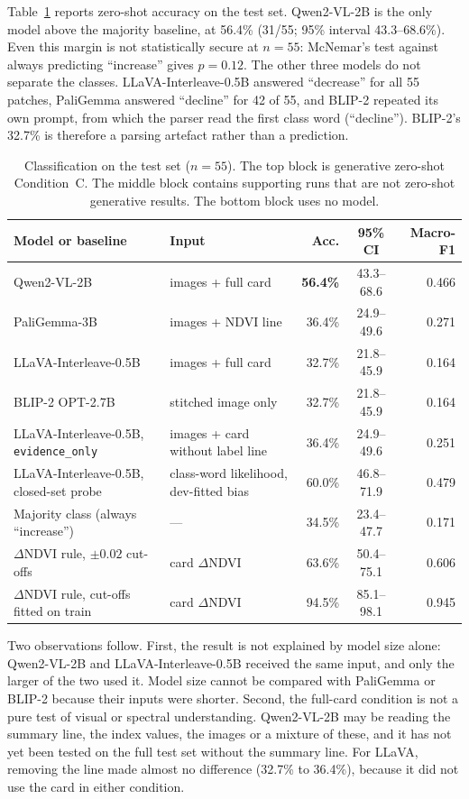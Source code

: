 \documentclass[11pt]{article}
\begin{document}
Table~\ref{tab:zeroshot} reports zero-shot accuracy on the test set.
Qwen2-VL-2B is the only model above the majority baseline, at 56.4\%
(31/55; 95\% interval 43.3--68.6\%). Even this margin is not
statistically secure at $n = 55$: McNemar's test against always
predicting ``increase'' gives $p = 0.12$. The other three models do not
separate the classes. LLaVA-Interleave-0.5B answered ``decrease'' for
all 55 patches, PaliGemma answered ``decline'' for 42 of 55, and BLIP-2
repeated its own prompt, from which the parser read the first class word
(``decline''). BLIP-2's 32.7\% is therefore a parsing artefact rather
than a prediction.

\begin{table}[t]
\centering
\small
\begin{tabular}{llrcr}
\toprule
Model or baseline & Input & Acc. & 95\% CI & Macro-F1 \\
\midrule
Qwen2-VL-2B & images + full card & \textbf{56.4\%} & 43.3--68.6 & 0.466 \\
PaliGemma-3B & images + NDVI line & 36.4\% & 24.9--49.6 & 0.271 \\
LLaVA-Interleave-0.5B & images + full card & 32.7\% & 21.8--45.9 & 0.164 \\
BLIP-2 OPT-2.7B & stitched image only & 32.7\% & 21.8--45.9 & 0.164 \\
\midrule
LLaVA-Interleave-0.5B, \texttt{evidence\_only} & images + card without label line & 36.4\% & 24.9--49.6 & 0.251 \\
LLaVA-Interleave-0.5B, closed-set probe & class-word likelihood, dev-fitted bias & 60.0\% & 46.8--71.9 & 0.479 \\
\midrule
Majority class (always ``increase'') & --- & 34.5\% & 23.4--47.7 & 0.171 \\
$\Delta$NDVI rule, $\pm 0.02$ cut-offs & card $\Delta$NDVI & 63.6\% & 50.4--75.1 & 0.606 \\
$\Delta$NDVI rule, cut-offs fitted on train & card $\Delta$NDVI & 94.5\% & 85.1--98.1 & 0.945 \\
\bottomrule
\end{tabular}
\caption{Classification on the test set ($n = 55$). The top block is
generative zero-shot Condition~C. The middle block contains supporting
runs that are not zero-shot generative results. The bottom block uses no
model.}
\label{tab:zeroshot}
\end{table}

Two observations follow. First, the result is not explained by model
size alone: Qwen2-VL-2B and LLaVA-Interleave-0.5B received the same
input, and only the larger of the two used it. Model size cannot be
compared with PaliGemma or BLIP-2 because their inputs were shorter.
Second, the full-card condition is not a pure test of visual or spectral
understanding. Qwen2-VL-2B may be reading the summary line, the index
values, the images or a mixture of these, and it has not yet been tested
on the full test set without the summary line. For LLaVA, removing the
line made almost no difference (32.7\% to 36.4\%), because it did not
use the card in either condition.
\end{document}
